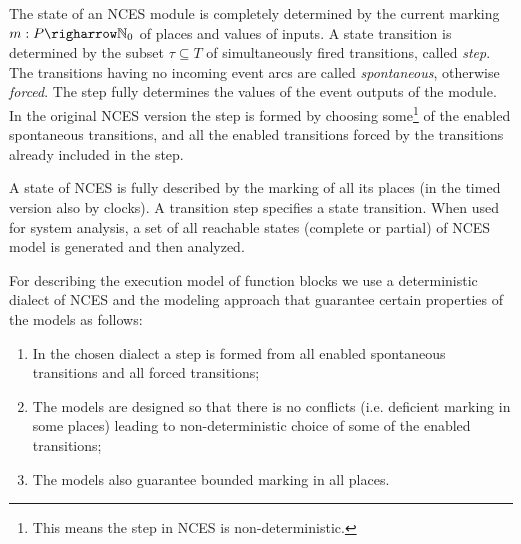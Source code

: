 The state of an NCES module is completely determined by the
current marking $m: P \righarrow \N_0$ of places and values of
inputs. A state transition is determined by the subset $\tau
\subseteq T$ of simultaneously fired transitions, called {\it
step}. The transitions having no incoming event arcs are called
{\it spontaneous}, otherwise {\it forced}. The step fully determines the
values of the event outputs of the module. In the original NCES version the step is formed by
choosing some\footnote{This means the step in NCES is non-deterministic.} of the enabled spontaneous transitions, and all the enabled transitions forced by the transitions already included in the step. 

A state of NCES is fully described by the marking of all its places (in the timed version also by clocks). A transition step specifies a state transition. 
When used for system analysis, a set of all reachable states (complete or partial) 
of NCES model is generated and then analyzed.

For describing the execution model of function blocks we use a deterministic dialect 
of NCES and the modeling approach that guarantee certain properties of the models as follows: 
\begin{enumerate}
\item In the chosen dialect a step is formed from all enabled spontaneous transitions and all forced transitions;
\item The models are designed so that there is no conflicts (i.e. deficient marking in some places) leading to non-deterministic choice of some of the enabled transitions;
\item The models also guarantee bounded marking in all places.
\end{enumerate}

